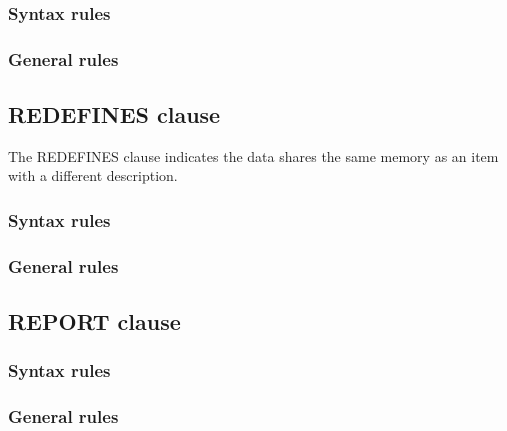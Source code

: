 \subsubsection{Syntax rules}

\subsubsection{General rules}

\subsection{REDEFINES clause}

The REDEFINES clause indicates the data shares the same memory as an item with a different description.

\begin{syntax}
   \identifier
\end{syntax}

\subsubsection{Syntax rules}

\subsubsection{General rules}

\subsection{REPORT clause}

\begin{syntax}
\end{syntax}

\subsubsection{Syntax rules}

\subsubsection{General rules}

